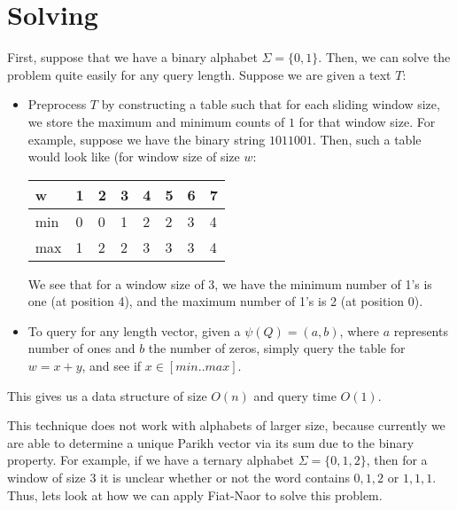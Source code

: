 \documentclass{article}
\begin{document}
\section{Solving}
\label{sec:solving}
First, suppose that we have a binary alphabet $\Sigma = \{0,1\}$. Then, we can solve the problem quite easily for any query length. Suppose we are given a text $T$:
\begin{itemize}
    \item Preprocess $T$ by constructing a table such that for each sliding window size, we store the maximum and minimum counts of $1$ for that window size. For example, suppose we have the binary string $1011001$. Then, such a table would look like (for window size of size $w$:
    \begin{center}
        \begin{tabular}{l|lllllll}
        w   & 1 & 2 & 3 & 4 & 5 & 6 & 7 \\ \hline
        min & 0 & 0 & 1 & 2 & 2 & 3 & 4 \\ \hline
        max & 1 & 2 & 2 & 3 & 3 & 3 & 4
        \end{tabular}
    \end{center}
    We see that for a window size of 3, we have the minimum number of 1's is one (at position 4), and the maximum number of 1's is 2 (at position 0).
    
    \item To query for any length vector, given a $\psi(Q) = (a,b)$, where $a$ represents number of ones and $b$ the number of zeros, simply query the table for $w = x+y$, and see if $x \in [min..max]$.
\end{itemize}
This gives us a data structure of size $O(n)$ and query time $O(1)$. \cite{burcsi2012algorithms}

This technique does not work with alphabets of larger size, because currently we are able to determine a unique Parikh vector via its sum due to the binary property. For example, if we have a ternary alphabet $\Sigma = \{0,1,2\}$, then for a window of size $3$ it is unclear whether or not the word contains $0,1,2$ or $1,1,1$. Thus, lets look at how we can apply Fiat-Naor to solve this problem.
\end{document}
